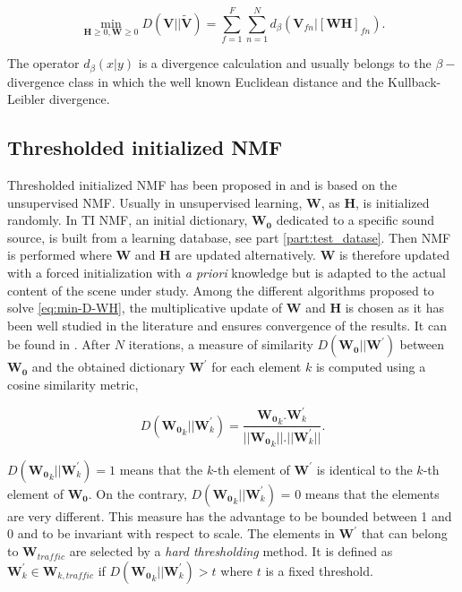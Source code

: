 \documentclass[12pt,english,twoside]{article}
\begin{document}
\begin{equation}\label{eq:min-D-WH}
\underset{\mathbf{H} \geq 0, \mathbf{W} \geq 0}{\min} D\left(\mathbf{V} \vert \vert \mathbf{\tilde{V}}\right) = \sum_{f = 1}^{F} \sum_{n = 1}^{N} d_{\beta}
\left(\textbf{V}_{fn} \vert \left[ \textbf{WH} \right]_{fn} \right).
\end{equation}

The operator $d_{\beta}(x\vert y)$ is a divergence calculation and usually belongs to the $\beta-$divergence class \cite{fevotte_nonnegative_2009} in which the well known Euclidean distance and the Kullback-Leibler divergence.

\subsection{Thresholded initialized NMF}
Thresholded initialized NMF has been proposed in \cite{gloaguen2019road} and is based on the unsupervised NMF. Usually in unsupervised learning, $\mathbf{W}$, as  $\mathbf{H}$, is initialized randomly. In TI NMF, an initial dictionary, $\mathbf{W_0}$ dedicated to a specific sound source, is built from a learning database, see part \ref{part:test_datase}.
Then NMF is performed where $\mathbf{W}$ and $\mathbf{H}$ are updated alternatively. $\mathbf{W}$ is therefore updated with a forced initialization with \textit{a priori} knowledge but is adapted to the actual content of the scene under study. Among the different algorithms proposed to solve \ref{eq:min-D-WH}, the multiplicative update of $\mathbf{W}$ and $\mathbf{H}$ is chosen as it has been well studied in the literature and ensures convergence of the results. It can be found in \cite{fevotte_algorithms_2011}.
After $N$ iterations, a measure of similarity $D\left(\mathbf{W_0} \vert \vert \mathbf{W}^{'} \right)$ between $\mathbf{W_0}$ and the obtained dictionary $\mathbf{W}^{'}$ for each element $k$ is computed using a cosine similarity metric,

\begin{equation}
D\left(\mathbf{W_0}_k \vert \vert \mathbf{W}^{'}_k \right) = \frac{\mathbf{W_0}_k.\mathbf{W}^{'}_k}{\vert \vert \mathbf{W_0}_k  \vert \vert . \vert \vert \mathbf{W}^{'}_k \vert \vert}.
\end{equation}

$D\left(\mathbf{W_0}_k \vert \vert \mathbf{W}^{'}_k \right) = 1$ means that the $k$-th element of $\mathbf{W}^{'}$ is identical to the $k$-th element of $\mathbf{W_0}$. On the contrary, $D\left(\mathbf{W_0}_k \vert \vert \mathbf{W}^{'}_k \right)$ = 0 means that the elements are very different. This measure has the advantage to be bounded between 1 and 0 and to be invariant with respect to scale. The elements in $\mathbf{W}^{'}$ that can belong to $\mathbf{W}_{traffic}$ are selected by a \textit{hard thresholding} method. It is defined as $\mathbf{W}^{'}_k \in \mathbf{W}_{k,traffic}$ if $D\left(\mathbf{W_0}_k \vert \vert \mathbf{W}^{'}_{k} \right) > t$ where $t$ is a fixed threshold.
\end{document}
